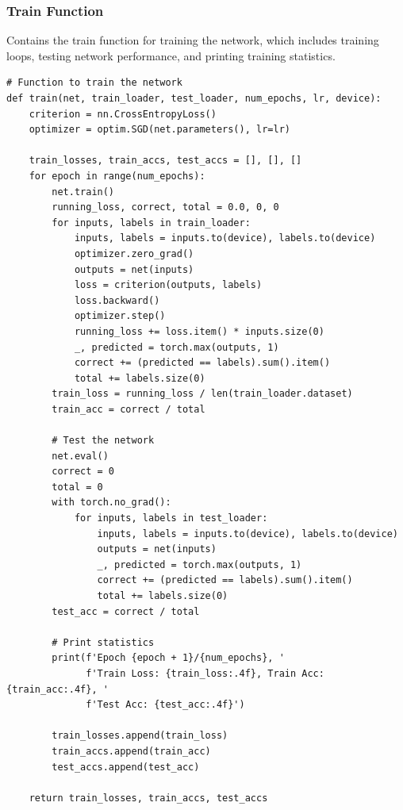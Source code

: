 \documentclass[a4paper,12pt]{article}
\begin{document}
\subsubsection{Train Function}
Contains the train function for training the network, which includes training loops, testing network performance, and printing training statistics.
\begin{lstlisting}
# Function to train the network
def train(net, train_loader, test_loader, num_epochs, lr, device):
    criterion = nn.CrossEntropyLoss()
    optimizer = optim.SGD(net.parameters(), lr=lr)

    train_losses, train_accs, test_accs = [], [], []
    for epoch in range(num_epochs):
        net.train()
        running_loss, correct, total = 0.0, 0, 0
        for inputs, labels in train_loader:
            inputs, labels = inputs.to(device), labels.to(device)
            optimizer.zero_grad()
            outputs = net(inputs)
            loss = criterion(outputs, labels)
            loss.backward()
            optimizer.step()
            running_loss += loss.item() * inputs.size(0)
            _, predicted = torch.max(outputs, 1)
            correct += (predicted == labels).sum().item()
            total += labels.size(0)
        train_loss = running_loss / len(train_loader.dataset)
        train_acc = correct / total

        # Test the network
        net.eval()
        correct = 0
        total = 0
        with torch.no_grad():
            for inputs, labels in test_loader:
                inputs, labels = inputs.to(device), labels.to(device)
                outputs = net(inputs)
                _, predicted = torch.max(outputs, 1)
                correct += (predicted == labels).sum().item()
                total += labels.size(0)
        test_acc = correct / total

        # Print statistics
        print(f'Epoch {epoch + 1}/{num_epochs}, '
              f'Train Loss: {train_loss:.4f}, Train Acc: {train_acc:.4f}, '
              f'Test Acc: {test_acc:.4f}')

        train_losses.append(train_loss)
        train_accs.append(train_acc)
        test_accs.append(test_acc)

    return train_losses, train_accs, test_accs
\end{lstlisting}
\end{document}
